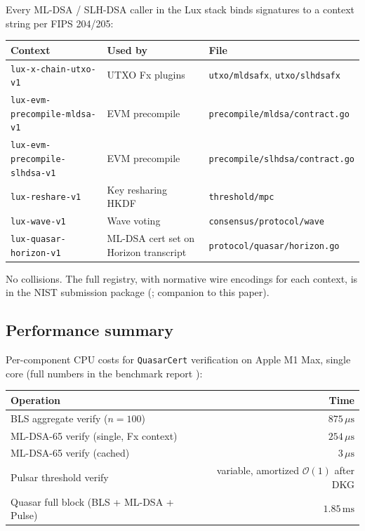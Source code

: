 Every ML-DSA / SLH-DSA caller in the Lux stack binds signatures to a context string per FIPS 204/205:

\begin{tabular}{@{}p{}p{}p{}@{}}
  \toprule
  \textbf{Context} & \textbf{Used by} & \textbf{File} \\
  \midrule
  \texttt{lux-x-chain-utxo-v1} & UTXO Fx plugins & \texttt{utxo/mldsafx}, \texttt{utxo/slhdsafx} \\
  \texttt{lux-evm-precompile-mldsa-v1} & EVM precompile & \texttt{precompile/mldsa/contract.go} \\
  \texttt{lux-evm-precompile-slhdsa-v1} & EVM precompile & \texttt{precompile/slhdsa/contract.go} \\
  \texttt{lux-reshare-v1} & Key resharing HKDF & \texttt{threshold/mpc} \\
  \texttt{lux-wave-v1} & Wave voting & \texttt{consensus/protocol/wave} \\
  \texttt{lux-quasar-horizon-v1} & ML-DSA cert set on Horizon transcript & \texttt{protocol/quasar/horizon.go} \\
  \bottomrule
\end{tabular}

No collisions. The full registry, with normative wire encodings for each context, is in the NIST submission package (\cite{luxbenchmarks}; companion to this paper).

\subsection{Performance summary}

Per-component CPU costs for \texttt{QuasarCert} verification on Apple M1 Max, single core (full numbers in the benchmark report \cite{luxbenchmarks}):

\begin{tabular}{@{}lr@{}}
  \toprule
  Operation & Time \\
  \midrule
  BLS aggregate verify ($n=100$) & $875\,\mu\mathrm{s}$ \\
  ML-DSA-65 verify (single, Fx context) & $254\,\mu\mathrm{s}$ \\
  ML-DSA-65 verify (cached) & $3\,\mu\mathrm{s}$ \\
  Pulsar threshold verify & variable, amortized $\mathcal{O}(1)$ after DKG \\
  Quasar full block (BLS + ML-DSA + Pulse) & $1.85\,\mathrm{ms}$ \\
  \bottomrule
\end{tabular}

